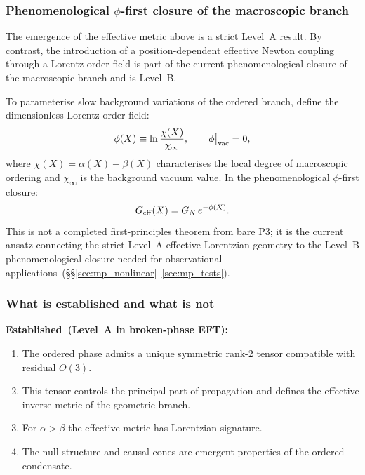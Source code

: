 \subsubsection*{Phenomenological $\phi$-first closure of the macroscopic branch}

The emergence of the effective metric above is a strict Level~A result.
By contrast, the introduction of a position-dependent effective Newton
coupling through a Lorentz-order field is part of the current
phenomenological closure of the macroscopic branch and is Level~B.

To parameterise slow background variations of the ordered branch, define
the dimensionless Lorentz-order field:
\begin{equation}
  \label{eq:phi_def}
  \phi(X)\equiv\ln\frac{\chi(X)}{\chi_\infty},
  \qquad \phi\big|_{\rm vac}=0,
\end{equation}
where $\chi(X)=\alpha(X)-\beta(X)$ characterises the local degree of
macroscopic ordering and $\chi_\infty$ is the background vacuum value.
In the phenomenological $\phi$-first closure:
\begin{equation}
  \label{eq:Geff_phi}
  G_{\rm eff}(X)=G_N\,e^{-\phi(X)}.
\end{equation}
This is not a completed first-principles theorem from bare P3; it is
the current ansatz connecting the strict Level~A effective Lorentzian
geometry to the Level~B phenomenological closure needed for
observational applications~(\S\S\ref{sec:mp_nonlinear}--\ref{sec:mp_tests}).

\subsubsection*{What is established and what is not}

\textbf{Established~(Level~A in broken-phase EFT):}
\begin{enumerate}[label=(\roman*)]
  \item The ordered phase admits a unique symmetric rank-2 tensor
    compatible with residual $O(3)$.
  \item This tensor controls the principal part of propagation and
    defines the effective inverse metric of the geometric branch.
  \item For $\alpha>\beta$ the effective metric has Lorentzian signature.
  \item The null structure and causal cones are emergent properties of
    the ordered condensate.
\end{enumerate}

